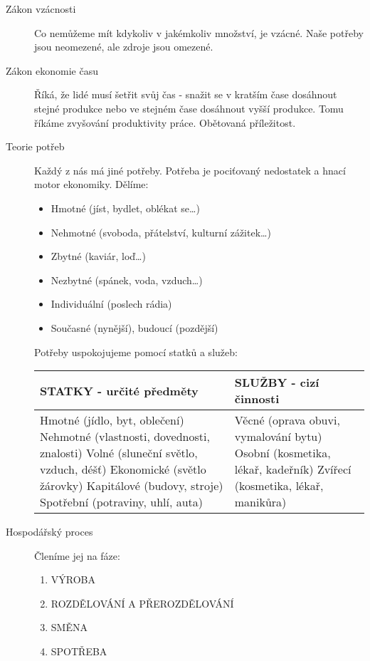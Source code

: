 \documentclass[12pt,a4paper,twoside]{book}
\begin{document}
\begin{description}
\begin{enumerate}
	\end{enumerate}
	\item[Zákon vzácnosti] Co nemůžeme mít kdykoliv v jakémkoliv množství, je vzácné. Naše potřeby jsou neomezené, ale zdroje jsou omezené.
	\item[Zákon ekonomie času] Říká, že lidé musí šetřit svůj čas - snažit se v kratším čase dosáhnout stejné produkce nebo ve stejném
čase dosáhnout vyšší produkce. Tomu říkáme zvyšování produktivity práce. Obětovaná příležitost.
	\item[Teorie potřeb] Každý z nás má jiné potřeby. Potřeba je pociťovaný nedostatek a hnací motor ekonomiky. Dělíme:
	\begin{itemize}
		\item Hmotné (jíst, bydlet, oblékat se\ldots)
		\item Nehmotné (svoboda, přátelství, kulturní zážitek\ldots)
		\item Zbytné (kaviár, loď\ldots)
		\item Nezbytné (spánek, voda, vzduch\ldots)
		\item Individuální (poslech rádia)
		\item Současné (nynější), budoucí (pozdější)
	\end{itemize}
	Potřeby uspokojujeme pomocí statků a služeb:

\begin{tabular}{| p{8cm} | p{8cm} |}
	\hline
		\textbf{STATKY - určité předměty} & \textbf{SLUŽBY - cizí činnosti} \\
	\hline
	 Hmotné (jídlo, byt, oblečení) \newline Nehmotné (vlastnosti, dovednosti, znalosti) \newline Volné (sluneční světlo, vzduch, déšť) \newline Ekonomické (světlo žárovky) \newline Kapitálové (budovy, stroje) \newline Spotřební (potraviny, uhlí, auta) & Věcné (oprava obuvi, vymalování bytu) \newline Osobní (kosmetika, lékař, kadeřník) \newline Zvířecí (kosmetika, lékař, manikůra) \\
	\hline
\end{tabular}
	\item[Hospodářský proces] Členíme jej na fáze:
	\begin{enumerate}
		\item VÝROBA
		\item ROZDĚLOVÁNÍ A PŘEROZDĚLOVÁNÍ
		\item SMĚNA
		\item SPOTŘEBA
	\end{enumerate}


\end{description}
\end{document}

